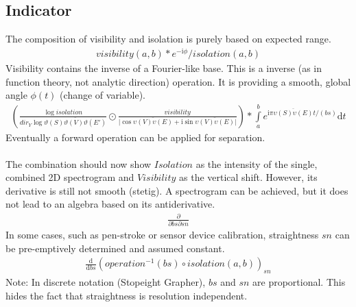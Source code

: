 \documentclass{report}
\begin{document}
\subsection{Indicator}
The composition of visibility and isolation is purely based on expected range.
\begin{align}
visibility(a,b)*e^{-\mathrm{i}\phi}/isolation(a,b)
\end{align}
Visibility contains the inverse of a Fourier-like base. This is a inverse (as in function theory, not analytic direction) operation. It is providing a smooth, global angle $\phi(t)$ (change of variable).
\begin{align}
(\frac{\log isolation}{dir_{Y}\log\overline{\vartheta (S)\vartheta (V)\vartheta (E')}} \odot \frac{visibility}{\lvert \cos\overline{\upsilon (V)\upsilon (E)}+\mathrm{i}\sin\overline{\upsilon (V)\upsilon (E)}\rvert})*\int \limits _{a}^{b} e^{\mathrm{i}\pi\overline{\upsilon (S)\upsilon (E)}t/(bs)}\mathrm{d}t
\end{align}
Eventually a forward operation can be applied for separation.\\\\
The combination should now show $Isolation$ as the intensity of the single, combined 2D spectrogram and $Visibility$ as the vertical shift. However, its derivative is still not smooth (stetig). A spectrogram can be achieved, but it does not lead to an algebra based on its antiderivative.
\begin{align}
\frac{\partial}{\partial bs\partial sn}\label{eq:3}
\end{align}
In some cases, such as pen-stroke or sensor device calibration, straightness $sn$ can be pre-emptively determined and assumed constant.
\begin{align}
\frac{\mathrm{d}}{\mathrm{d} bs} (operation^{-1}(bs) \circ isolation(a,b))_{sn}
\end{align}
Note: In discrete notation (Stopeight Grapher), $bs$ and $sn$ are proportional. This hides the fact that straightness is resolution independent.
\end{document}
